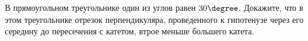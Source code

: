 \begin{ex}
	\begin{condition}
		В прямоугольном треугольнике один из углов равен \( 30\degree \). Докажите, что в этом треугольнике отрезок перпендикуляра, проведенного к гипотенузе через его середину до пересечения с катетом, втрое меньше большего катета.
	\end{condition}
\end{ex}